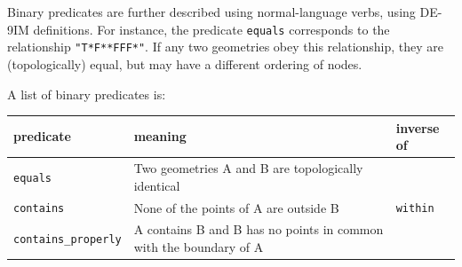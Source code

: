\documentclass[]{book}
\begin{document}
Binary predicates are further described using normal-language verbs,
using DE-9IM definitions. For instance, the predicate \texttt{equals}
corresponds to the relationship \texttt{"T*F**FFF*"}. If any two geometries
obey this relationship, they are (topologically) equal, but may
have a different ordering of nodes.

A list of binary predicates is:

\begin{longtable}[]{@{}lll@{}}
\toprule
\begin{minipage}[b]{0.23\columnwidth}\raggedright
predicate\strut
\end{minipage} & \begin{minipage}[b]{0.54\columnwidth}\raggedright
meaning\strut
\end{minipage} & \begin{minipage}[b]{0.13\columnwidth}\raggedright
inverse of\strut
\end{minipage}\tabularnewline
\midrule
\endhead
\begin{minipage}[t]{0.23\columnwidth}\raggedright
\texttt{equals}\strut
\end{minipage} & \begin{minipage}[t]{0.54\columnwidth}\raggedright
Two geometries A and B are topologically identical\strut
\end{minipage} & \begin{minipage}[t]{0.13\columnwidth}\raggedright
\strut
\end{minipage}\tabularnewline
\begin{minipage}[t]{0.23\columnwidth}\raggedright
\texttt{contains}\strut
\end{minipage} & \begin{minipage}[t]{0.54\columnwidth}\raggedright
None of the points of A are outside B\strut
\end{minipage} & \begin{minipage}[t]{0.13\columnwidth}\raggedright
\texttt{within}\strut
\end{minipage}\tabularnewline
\begin{minipage}[t]{0.23\columnwidth}\raggedright
\texttt{contains\_properly}\strut
\end{minipage} & \begin{minipage}[t]{0.54\columnwidth}\raggedright
A contains B and B has no points in common with the boundary of A\strut
\end{minipage} & \begin{minipage}[t]{0.13\columnwidth}\raggedright

\end{minipage}
\end{longtable}
\end{document}
